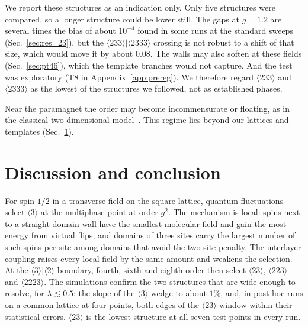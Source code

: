\documentclass[
 aps,prb,
 twocolumn,
 superscriptaddress,
 longbibliography,
 nofootinbib,
 floatfix
]{revtex4-2}
\begin{document}
We report these structures as an indication only. Only five structures were compared, so a longer structure
could be lower still. The gaps at $g=1.2$ are several times the bias of about $10^{-4}$ found in some runs at the standard
sweeps (Sec.~\ref{sec:res_23}), but the $\langle233\rangle|\langle2333\rangle$ crossing is not robust to a shift of that
size, which would move it by about $0.08$. The walls may also soften at these fields (Sec.~\ref{sec:pt46}), which
the template branches would not capture. And the test was exploratory (T8 in Appendix~\ref{app:prereg}).
We therefore regard $\langle233\rangle$ and $\langle2333\rangle$ as the lowest of the structures we followed, not as
established phases.

Near the paramagnet the order may become incommensurate or floating, as in the classical two-dimensional
model~\cite{villain1981two,hu2021resolving}. This regime lies beyond our lattices and templates
(Sec.~\ref{sec:conclusion}).

\section{Discussion and conclusion}
\label{sec:conclusion}

For spin $1/2$ in a transverse field on the square lattice, quantum fluctuations select
$\langle3\rangle$ at the multiphase point at order $g^2$. The mechanism is local: spins next to a straight domain wall
have the smallest molecular field and gain the most energy from virtual flips, and domains of three sites carry the
largest number of such spins per site among domains that avoid the two-site penalty. The interlayer coupling raises
every local field by the same amount and weakens the selection. At the $\langle3\rangle|\langle2\rangle$ boundary,
fourth, sixth and eighth order then select $\langle23\rangle$, $\langle223\rangle$ and $\langle2223\rangle$. The
simulations confirm the two structures that are wide enough to resolve, for $\lambda\lesssim0.5$: the slope of the
$\langle3\rangle$ wedge to about $1\%$, and, in post-hoc runs on a common lattice at four points, both edges of the
$\langle23\rangle$ window within their statistical errors. $\langle23\rangle$ is the lowest structure at all seven test
points in every run.
\end{document}
